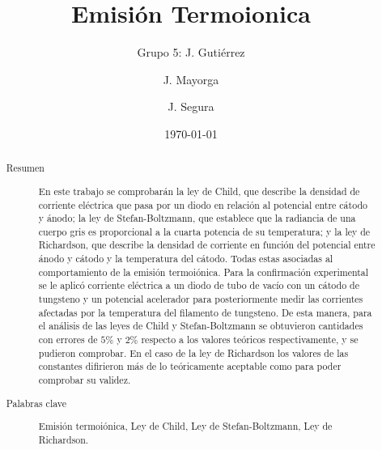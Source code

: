 \documentclass[%
 reprint,
 amsmath,amssymb,
 aps,
]{revtex4-2}
\begin{document}

\title{Emisión Termoionica}%

 
\author{Grupo 5: J. Gutiérrez}
\author{J. Mayorga}
\author{J. Segura}
%
\date{\today}%
\begin{abstract}
\begin{description}
\item[Resumen] En este trabajo se comprobarán la ley de Child, que describe la densidad de corriente eléctrica que pasa por un diodo en relación al potencial entre cátodo y ánodo; la ley de Stefan-Boltzmann, que establece que la radiancia de una cuerpo gris es proporcional a la cuarta potencia de su temperatura; y la ley de Richardson, que describe la densidad de corriente en función del potencial entre ánodo y cátodo y la temperatura del cátodo. Todas estas asociadas al comportamiento de la emisión termoiónica. Para la confirmación experimental se le aplicó corriente eléctrica a un diodo de tubo de vacío con un cátodo de tungsteno y un potencial acelerador para posteriormente medir las corrientes afectadas por la temperatura del filamento de tungsteno. De esta manera, para el análisis de las leyes de Child y Stefan-Boltzmann se obtuvieron cantidades con errores de $5\%$ y $2\%$ respecto a los valores teóricos respectivamente, y se pudieron comprobar. En el caso de la ley de Richardson los valores de las constantes difirieron más de lo teóricamente aceptable como para poder comprobar su validez.


\end{description}
\begin{description}
\item[Palabras clave] Emisión termoiónica, Ley de Child, Ley de Stefan-Boltzmann, Ley de Richardson.

\end{description}
\end{abstract}

\maketitle
\end{document}
